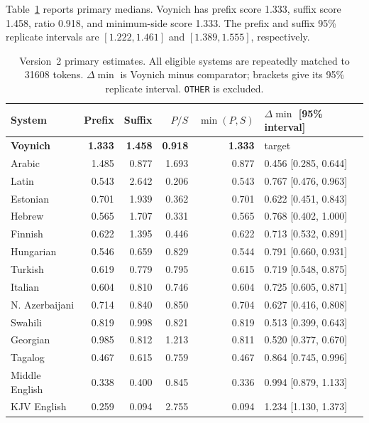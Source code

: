 \documentclass[11pt]{article}
\newcommand{\num}[1]{#1}
\begin{document}
Table~\ref{tab:comparison} reports primary medians. Voynich has prefix score
1.333, suffix score 1.458, ratio 0.918, and minimum-side score 1.333. The
prefix and suffix 95\% replicate intervals are $[1.222,1.461]$ and
$[1.389,1.555]$, respectively.

\begin{table}[ht]
\centering
\small
\caption{Version~2 primary estimates. All eligible systems are repeatedly
matched to \num{31608} tokens. $\Delta\min$ is Voynich minus comparator;
brackets give its 95\% replicate interval. \texttt{OTHER} is excluded.}
\label{tab:comparison}
\begin{tabular}{lrrrrl}
\toprule
System & Prefix & Suffix & $P/S$ & $\min(P,S)$ & $\Delta\min$ [95\% interval] \\
\midrule
\textbf{Voynich} & \textbf{1.333} & \textbf{1.458} & \textbf{0.918} & \textbf{1.333} & target \\
Arabic & 1.485 & 0.877 & 1.693 & 0.877 & 0.456 [0.285, 0.644] \\
Latin & 0.543 & 2.642 & 0.206 & 0.543 & 0.767 [0.476, 0.963] \\
Estonian & 0.701 & 1.939 & 0.362 & 0.701 & 0.622 [0.451, 0.843] \\
Hebrew & 0.565 & 1.707 & 0.331 & 0.565 & 0.768 [0.402, 1.000] \\
Finnish & 0.622 & 1.395 & 0.446 & 0.622 & 0.713 [0.532, 0.891] \\
Hungarian & 0.546 & 0.659 & 0.829 & 0.544 & 0.791 [0.660, 0.931] \\
Turkish & 0.619 & 0.779 & 0.795 & 0.615 & 0.719 [0.548, 0.875] \\
Italian & 0.604 & 0.810 & 0.746 & 0.604 & 0.725 [0.605, 0.871] \\
N. Azerbaijani & 0.714 & 0.840 & 0.850 & 0.704 & 0.627 [0.416, 0.808] \\
Swahili & 0.819 & 0.998 & 0.821 & 0.819 & 0.513 [0.399, 0.643] \\
Georgian & 0.985 & 0.812 & 1.213 & 0.811 & 0.520 [0.377, 0.670] \\
Tagalog & 0.467 & 0.615 & 0.759 & 0.467 & 0.864 [0.745, 0.996] \\
Middle English & 0.338 & 0.400 & 0.845 & 0.336 & 0.994 [0.879, 1.133] \\
KJV English & 0.259 & 0.094 & 2.755 & 0.094 & 1.234 [1.130, 1.373] \\
\bottomrule
\end{tabular}
\end{table}
\end{document}
